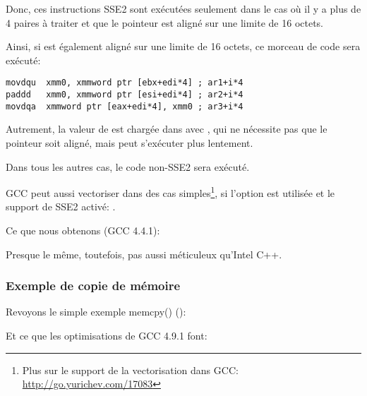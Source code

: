 Donc, ces instructions SSE2 sont exécutées seulement dans le cas où il y a plus
de 4 paires à traiter et que le pointeur  est aligné sur une limite de 16
octets.

Ainsi, si  est également aligné sur une limite de 16 octets, ce morceau de
code sera exécuté:

\begin{lstlisting}[style=customasmx86]
movdqu  xmm0, xmmword ptr [ebx+edi*4] ; ar1+i*4
paddd   xmm0, xmmword ptr [esi+edi*4] ; ar2+i*4
movdqa  xmmword ptr [eax+edi*4], xmm0 ; ar3+i*4
\end{lstlisting}

Autrement, la valeur de  est chargée dans  avec \MOVDQU, qui ne nécessite
pas que le pointeur soit aligné, mais peut s'exécuter plus lentement.



Dans tous les autres cas, le code non-SSE2 sera exécuté.


\newcommand{\URLGCCVEC}{\url{http://go.yurichev.com/17083}}

GCC peut aussi vectoriser dans des cas simples\footnote{Plus sur le support de la
vectorisation dans GCC: \URLGCCVEC}, si l'option \Othree est utilisée et le support
de SSE2 activé: .

Ce que nous obtenons (GCC 4.4.1):



Presque le même, toutefois, pas aussi méticuleux qu'Intel C++.

\subsubsection{Exemple de copie de mémoire}
\label{vec_memcpy}

Revoyons le simple exemple memcpy()
():



Et ce que les optimisations de GCC 4.9.1 font:


